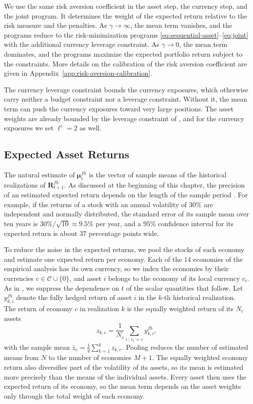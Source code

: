 We use the same risk aversion coefficient in the asset step, the currency step, and the joint program. It determines
the weight of the expected return relative to the risk measure and the penalties. As $\gamma \to \infty$, the mean
term vanishes, and the programs reduce to the risk-minimization programs
\eqref{eq:sequential-asset}--\eqref{eq:joint} with the additional currency leverage constraint. As $\gamma \to 0$, the mean
term dominates, and the programs maximize the expected portfolio return subject to the constraints. More details on the 
calibration of the risk aversion coefficient are given in Appendix~\ref{app:risk-aversion-calibration}.

The currency leverage constraint bounds the currency exposures, which otherwise carry neither a budget constraint nor a
leverage constraint. Without it, the mean term can push the currency exposures toward very large positions. The asset
weights are already bounded by the
leverage constraint of , and for the currency exposures we set $\ell^c = 2$ as well.

\subsection{Expected Asset Returns}\label{sec:expected-asset-returns}

The natural estimate of $\bm{\mu}^{fh}_t$ is the vector of sample means of the historical realizations of
$\bm{R}^{fh}_{t+1}$. As discussed at the beginning of this chapter, the precision of an estimated expected
return depends on the length of the sample period \cite{Merton1980}. For example, if the returns of a stock with an annual volatility of $30\%$ are independent and normally distributed, 
the standard error of its sample mean over ten years is $30\% / \sqrt{10} \approx 9.5\%$ per year, and a
$95\%$ confidence interval for its expected return is about $37$ percentage points wide. 

To reduce the noise in the expected returns, we pool the stocks of each economy and estimate one expected return per economy. Each of the $14$ economies
of the empirical analysis has its own currency, so we index the economies by their currencies
$c \in \mathcal{C} \cup \{0\}$, and asset $i$ belongs to the economy of its local currency $c_i$. As in
, we suppress the dependence on $t$ of the scalar quantities that follow. Let $y^{fh}_{k,i}$
denote the fully hedged return of asset $i$ in the $k$-th historical realization. The return of economy $c$ in
realization $k$ is the equally weighted return of its $N_c$ assets
\begin{equation*}
    z_{k,c} = \frac{1}{N_c} \sum_{i \,:\, c_i = c} y^{fh}_{k,i},
\end{equation*}
with the sample mean $\bar{z}_c = \frac{1}{q} \sum_{k=1}^q z_{k,c}$. Pooling reduces the number of estimated means
from $N$ to the number of economies $M + 1$. The equally weighted economy
return also diversifies part of the volatility of its assets, so its mean is estimated more precisely than the means of
the individual assets. Every asset then uses the expected return of its economy, so the mean term depends on the
asset weights only through the total weight of each economy. 

